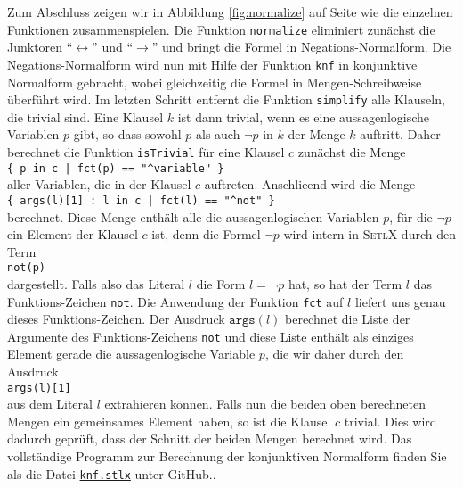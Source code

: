 Zum Abschluss zeigen wir in Abbildung \ref{fig:normalize} auf Seite \pageref{fig:normalize}
wie die einzelnen Funktionen zusammenspielen.  Die Funktion \texttt{normalize} eliminiert
zun\"{a}chst die Junktoren ``$\leftrightarrow$'' und ``$\rightarrow$'' und bringt die Formel
in Negations-Normalform.  Die Negations-Normalform wird nun mit Hilfe der Funktion
\texttt{knf} in konjunktive Normalform gebracht, wobei gleichzeitig die Formel in
Mengen-Schreibweise \"{u}berf\"{u}hrt wird.  Im letzten Schritt entfernt die Funktion
\texttt{simplify} alle Klauseln, die trivial sind.   Eine Klausel $k$ ist dann trivial,
wenn es eine aussagenlogische Variablen $p$ gibt, so dass sowohl $p$ als auch $\neg p$
in $k$ der Menge $k$ auftritt.  Daher berechnet die Funktion \texttt{isTrivial} f\"{u}r eine
Klausel $c$ zun\"{a}chst die Menge
\\[0.2cm]
\hspace*{1.3cm}
\verb'{ p in c | fct(p) == "^variable" }'
\\[0.2cm]
aller Variablen, die in der Klausel $c$ auftreten.  Anschlie\3end wird die Menge
\\[0.2cm]
\hspace*{1.3cm}
\verb'{ args(l)[1] : l in c | fct(l) == "^not" }'
\\[0.2cm]
berechnet.  Diese Menge enth\"{a}lt alle die aussagenlogischen Variablen $p$, f\"{u}r die $\neg p$
ein Element der Klausel $c$ ist, denn die Formel $\neg p$ wird intern in \textsc{SetlX}
durch den Term
\\[0.2cm]
\hspace*{1.3cm}
\texttt{not(p)}
\\[0.2cm]
dargestellt.  Falls also das Literal $l$ die Form $l = \neg p$ hat, so hat der Term $l$
das Funktions-Zeichen \texttt{not}.  Die Anwendung der Funktion
\texttt{fct} auf $l$ liefert uns genau dieses Funktions-Zeichen.  Der Ausdruck
$\texttt{args}(l)$ berechnet die Liste der Argumente des Funktions-Zeichens 
\texttt{not} und diese Liste enth\"{a}lt als einziges Element gerade die
aussagenlogische Variable $p$, die wir daher durch den Ausdruck
\\[0.2cm]
\hspace*{1.3cm}
\texttt{args(l)[1]}
\\[0.2cm]
aus dem Literal $l$ extrahieren k\"{o}nnen.  Falls nun die beiden oben berechneten Mengen ein
gemeinsames Element haben, so ist die Klausel $c$ trivial.  Dies wird dadurch gepr\"{u}ft,
dass der Schnitt der beiden Mengen berechnet wird.
Das vollst\"{a}ndige Programm zur Berechnung der konjunktiven Normalform finden Sie als die Datei
\href{https://github.com/karlstroetmann/Logik/blob/master/SetlX/knf.stlx}{\texttt{knf.stlx}}
unter GitHub..


